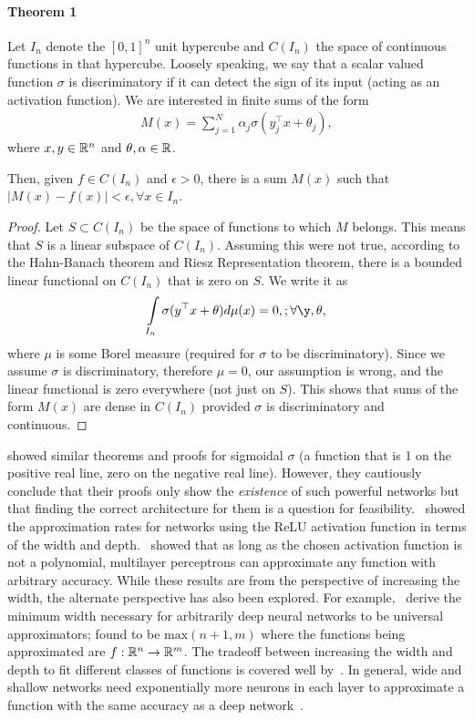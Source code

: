 \paragraph{Theorem 1}
\begin{theorem}
Let $I_n$ denote the $[0, 1]^n$ unit hypercube and $C(I_n)$ the space of continuous functions in that hypercube. Loosely speaking, we say that a scalar valued function $\sigma$ is discriminatory if it can detect the sign of its input (acting as an activation function). We are interested in finite sums of the form
\begin{align}
M(x) = \sum\limits_{j=1}^N \alpha_j \sigma(y_j^{\top} x + \theta_j),
\end{align}
where $x,y \in \mathbb{R}^n$ and $\theta, \alpha \in \mathbb{R}$. 
\end{theorem}
Then, given $f \in C(I_n)$ and $\epsilon > 0$, there is a sum $M(x)$ such that $|M(x) - f(x)| < \epsilon, \forall x \in I_n$.
\begin{proof}
Let $S \subset C(I_n)$ be the space of functions to which $M$ belongs. This means that $S$ is a linear subspace of $C(I_n)$. Assuming this were not true, according to the Hahn-Banach theorem and Riesz Representation theorem, there is a bounded linear functional on $C(I_n)$ that is zero on $S$. We write it as
\begin{align}
\int\limits_{I_n} \sigma(y^{\top} x + \theta) d \mu(x) = 0, ; \forall \y, \theta,
\end{align}
where $\mu$ is some Borel measure (required for $\sigma$ to be discriminatory). Since we assume $\sigma$ is discriminatory, therefore $\mu = 0$, our assumption is wrong, and the linear functional is zero everywhere (not just on $S$). This shows that sums of the form $M(x)$ are dense in $C(I_n)$ provided $\sigma$ is discriminatory and continuous.
\end{proof}
\citep{cybenko1989approximation} showed similar theorems and proofs for sigmoidal $\sigma$ (a function that is 1 on the positive real line, zero on the negative real line). However, they cautiously conclude that their proofs only show the \emph{existence} of such powerful networks but that finding the correct architecture for them is a question for feasibility.~\citep{shen2022optimal} showed the approximation rates for networks using the ReLU activation function in terms of the width and depth.~\citep{leshno1993multilayer} showed that as long as the chosen activation function is not a polynomial, multilayer perceptrons can approximate any function with arbitrary accuracy. While these results are from the perspective of increasing the width, the alternate perspective has also been explored. For example,~\citep{lu2017expressive, park2020minimum} derive the minimum width necessary for arbitrarily deep neural networks to be universal approximators; found to be $\text{max}(n + 1, m)$ where the functions being approximated are $f: \mathbb{R}^n \rightarrow \mathbb{R}^m$. The tradeoff between increasing the width and depth to fit different classes of functions is covered well by~\citep{telgarsky2016benefits}. In general, wide and shallow networks need exponentially more neurons in each layer to approximate a function with the same accuracy as a deep network~\cite[Theorem 1.15]{holstermann2023expressive}.

